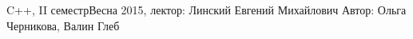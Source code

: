 


\BigHeader
	{C++, II семестр}{Весна 2015, лектор: Линский Евгений Михайлович}
	{Автор: Ольга Черникова, Валин Глеб}

 



